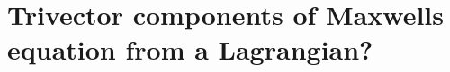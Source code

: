 \documentclass{article}
\newcommand{\LL}[0]{\mathcal{L}}
\newcommand{\spacegrad}[0]{\boldsymbol{\nabla}}
\begin{document}



\section{ Trivector components of Maxwells equation from a Lagrangian? }
\end{document}
